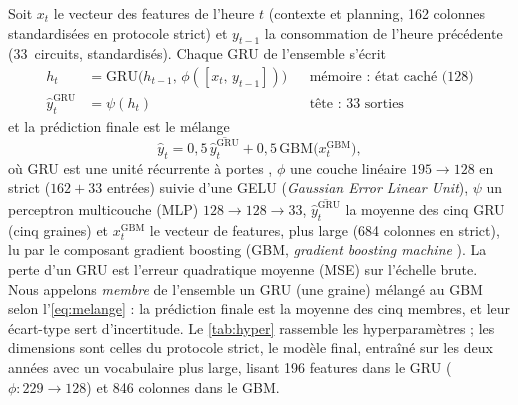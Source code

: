 \documentclass[11pt,a4paper]{article}
\begin{document}
Soit $x_t$ le vecteur des features de l'heure $t$ (contexte et planning, 162 colonnes standardisées en protocole strict) et $y_{t-1}$ la consommation de l'heure précédente (33~circuits, standardisés). Chaque GRU de l'ensemble s'écrit
\begin{align}
  h_t &= \mathrm{GRU}\bigl(h_{t-1},\, \phi([x_t,\, y_{t-1}])\bigr)
      && \text{mémoire : état caché (128)} \label{eq:gru}\\
  \hat{y}^{\mathrm{GRU}}_t &= \psi(h_t)
      && \text{tête : 33 sorties} \label{eq:tete}
\end{align}
et la prédiction finale est le mélange
\begin{equation}
  \hat{y}_t = 0{,}5\,\overline{\hat{y}^{\mathrm{GRU}}_t} + 0{,}5\,\mathrm{GBM}\bigl(x^{\mathrm{GBM}}_t\bigr), \label{eq:melange}
\end{equation}
où GRU est une unité récurrente à portes \citep{cho2014gru}, $\phi$ une couche linéaire $195 \to 128$ en strict ($162 + 33$ entrées) suivie d'une GELU (\emph{Gaussian Error Linear Unit}), $\psi$ un perceptron multicouche (MLP) $128 \to 128 \to 33$, $\overline{\hat{y}^{\mathrm{GRU}}_t}$ la moyenne des cinq GRU (cinq graines) et $x^{\mathrm{GBM}}_t$ le vecteur de features, plus large (684 colonnes en strict), lu par le composant gradient boosting (GBM, \emph{gradient boosting machine} \citep{friedman2001greedy}). La perte d'un GRU est l'erreur quadratique moyenne (MSE) sur l'échelle brute. Nous appelons \emph{membre} de l'ensemble un GRU (une graine) mélangé au GBM selon l'\autoref{eq:melange} : la prédiction finale est la moyenne des cinq membres, et leur écart-type sert d'incertitude. Le \autoref{tab:hyper} rassemble les hyperparamètres ; les dimensions sont celles du protocole strict, le modèle final, entraîné sur les deux années avec un vocabulaire plus large, lisant 196 features dans le GRU ($\phi : 229 \to 128$) et 846 colonnes dans le GBM.
\end{document}
